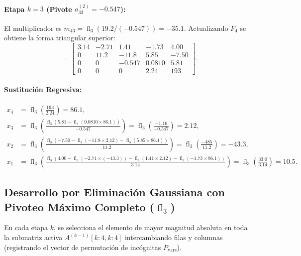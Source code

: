 \documentclass[11pt,letterpaper]{article}
\begin{document}
\paragraph{Etapa $k = 3$ (Pivote $a_{33}^{(2)} = -0.547$):}
El multiplicador es $m_{43} = \operatorname{fl}_3(19.2 / (-0.547)) = -35.1$. Actualizando $F_4$ se obtiene la forma triangular superior:
\begin{equation*}
    [A^{(3)} \mid b^{(3)}] =
    \left[
    \begin{array}{cccc|c}
        3.14 & -2.71 &   1.41 &  -1.73 &  4.00 \\
        0    &  11.2 &  -11.8 &   5.85 & -7.50 \\
        0    &  0    & -0.547 &  0.0810 & 5.81 \\
        0    &  0    &   0    &   2.24 &  193
    \end{array}
    \right].
\end{equation*}

\paragraph{Sustitución Regresiva:}
\begin{align*}
    x_4 &= \operatorname{fl}_3\left(\frac{193}{2.24}\right) = 86.1, \\
    x_3 &= \operatorname{fl}_3\left(\frac{\operatorname{fl}_3(5.81 - \operatorname{fl}_3(0.0810 \times 86.1))}{-0.547}\right) = \operatorname{fl}_3\left(\frac{-1.16}{-0.547}\right) = 2.12, \\
    x_2 &= \operatorname{fl}_3\left(\frac{\operatorname{fl}_3(-7.50 - \operatorname{fl}_3(-11.8 \times 2.12) - \operatorname{fl}_3(5.85 \times 86.1))}{11.2}\right) = \operatorname{fl}_3\left(\frac{-485}{11.2}\right) = -43.3, \\
    x_1 &= \operatorname{fl}_3\left(\frac{\operatorname{fl}_3(4.00 - \operatorname{fl}_3(-2.71 \times (-43.3)) - \operatorname{fl}_3(1.41 \times 2.12) - \operatorname{fl}_3(-1.73 \times 86.1))}{3.14}\right) = \operatorname{fl}_3\left(\frac{33.0}{3.14}\right) = 10.5.
\end{align*}

\subsection{Desarrollo por Eliminación Gaussiana con Pivoteo Máximo Completo ($\operatorname{fl}_3$)}
En cada etapa $k$, se selecciona el elemento de mayor magnitud absoluta en toda la submatriz activa $A^{(k-1)}[k:4, k:4]$ intercambiando filas y columnas (registrando el vector de permutación de incógnitas $P_{\text{vars}}$).
\end{document}
